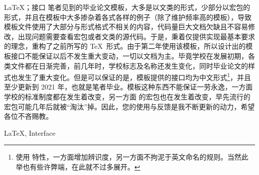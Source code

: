 \begin{中文摘要}{\LaTeX ；接口}
  笔者见到的毕业论文模板，大多是以文类的形式，少部分以宏包的形式，并且在模板中大多掺杂着各式各样的例子（除了维护频率高的模板），导致模板文件使用了大部分与形式格式不相关的内容，代码量巨大文档欠缺且不容易修改，出现问题需要查看宏包或者文类的源代码。于是，秉着仅提供实现最基本要求的理念，重构了之前所写的 \TeX\ 形式。由于第二年使用该模板，所以设计出的模板接口不能保证以后不发生重大变动，一切以文档为主。毕竟学校在发展初期，各类文件都在日渐完善，前几年时，学校标志及名称还发生变化，同时毕业论文的样式也发生了重大变化。但是可以保证的是，模板提供的接口均为中文形式\footnote{使用  特性，一方面增加辨识度，另一方面不拘泥于英文命名的规则。当然此举也有些许弊端，在此就不过多展开。}，并且至少更新到 2021 年，也就是笔者毕业。模板这种东西不能保证一劳永逸，一方面学校的标准制度都在发生着改变，另一方面  的宏包也在发生着改变，早先流行的宏包可能几年后就被“淘汰”掉。因此，您的使用与反馈是我不断更新的动力，希望各位不吝赐教。
\end{中文摘要}

\begin{英文摘要}{LaTeX, Interface}
  \lipsum[1]
\end{英文摘要}
